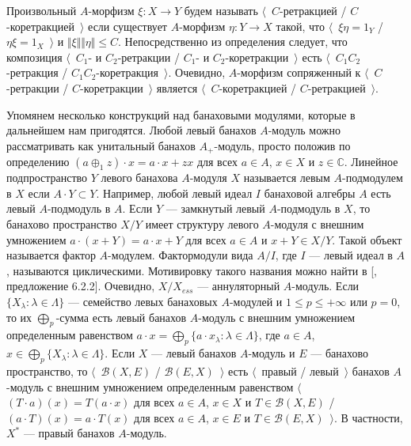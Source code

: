 Произвольный $A$-морфизм $\xi:X\to Y$ будем называть $\langle$~$C$-ретракцией /
$C$-коретракцией~$\rangle$ если существует $A$-морфизм $\eta:Y\to X$ такой, что
$\langle$~$\xi\eta=1_Y$ / $\eta\xi=1_X$~$\rangle$ и
$\Vert\xi\Vert\Vert\eta\Vert\leq C$. Непосредственно из определения следует, что
композиция $\langle$~$C_1$- и $C_2$-ретракции / $C_1$- и
$C_2$-коретракции~$\rangle$ есть $\langle$~$C_1C_2$-ретракция /
$C_1C_2$-коретракция~$\rangle$. Очевидно, $A$-морфизм сопряженный к
$\langle$~$C$-ретракции / $C$-коретракции~$\rangle$ является
$\langle$~$C$-коретракцией / $C$-ретракцией~$\rangle$.

Упомянем несколько конструкций над банаховыми модулями, которые в дальнейшем нам
пригодятся. Любой левый банахов $A$-модуль можно рассматривать как унитальный
банахов $A_+$-модуль, просто положив по определению 
$(a\oplus_1 z)\cdot x=a\cdot x+zx$ для всех 
$a\in A$, $x\in X$ и $z\in\mathbb{C}$. Линейное подпространство $
Y$ левого банахова $A$-модуля $X$ называется левым $A$-подмодулем в $X$ если
$A\cdot Y\subset Y$. Например, любой левый идеал $I$ банаховой алгебры $A$ есть
левый $A$-подмодуль в $A$. Если $Y$ --- замкнутый левый $A$-подмодуль в $X$, то
банахово пространство $X/Y$ имеет структуру левого $A$-модуля с внешним
умножением $a\cdot(x+Y)=a\cdot x+Y$ для всех $a\in A$ и $x+Y\in X/Y$. Такой
объект называется фактор $A$-модулем. Фактормодули вида $A/I$, где $I$ --- левый
идеал в $A$, называются циклическими. Мотивировку такого названия можно найти в
[\cite{HelBanLocConvAlg}, предложение 6.2.2]. Очевидно, $X/X_{ess}$ ---
аннуляторный $A$-модуль. Если $\{ X_\lambda:\lambda\in\Lambda \}$ --- семейство
левых банаховых $A$-модулей и $1\leq p\leq +\infty$ или $p=0$, то их
$\bigoplus_p$-сумма есть левый банахов $A$-модуль с внешним умножением
определенным равенством $a\cdot x=\bigoplus_p\{ a\cdot
x_\lambda:\lambda\in\Lambda \}$, где $a\in A$,
$x\in\bigoplus_p\{X_\lambda:\lambda\in\Lambda \}$. Если $X$ --- левый банахов
$A$-модуль и $E$ --- банахово пространство, то $\langle$~$\mathcal{B}(X,E)$ /
$\mathcal{B}(E,X)$~$\rangle$ есть $\langle$~правый / левый~$\rangle$ банахов
$A$-модуль с внешним умножением определенным равенством $\langle$~$(T\cdot
a)(x)=T(a\cdot x)$ для всех $a\in A$, $x\in X$ и $T\in\mathcal{B}(X, E)$ /
$(a\cdot T)(x)=a\cdot T(x)$ для всех $a\in A$, $x\in E$ и $T\in\mathcal{B}(E,
X)$~$\rangle$. В частности, $X^*$  --- правый банахов $A$-модуль.

